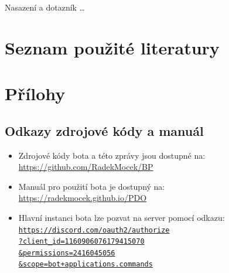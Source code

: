 \documentclass[FM]{tulthesis}
\begin{document}
	
	Nasazení a dotazník \dots %
	

	\chapter*{Seznam použité literatury}
	\printbibliography[heading=none]
	
	\appendix
	\chapter{Přílohy}
	
	\section{Odkazy zdrojové kódy a manuál}
	
	\begin{itemize}
		\item Zdrojové kódy bota a této zprávy jsou dostupné na: \\\url{https://github.com/RadekMocek/BP}%
		\item Manuál pro použití bota je dostupný na: \\\url{https://radekmocek.github.io/PDO}%
		\item Hlavní instanci bota lze pozvat na server pomocí odkazu: \\ \href{https://discord.com/oauth2/authorize?client_id=1160906076179415070&permissions=2416045056&scope=bot+applications.commands}{\texttt{https://discord.com/oauth2/authorize\\?client\_id=1160906076179415070\\\&permissions=2416045056\\\&scope=bot+applications.commands}}%
	\end{itemize}
	
\end{document}
